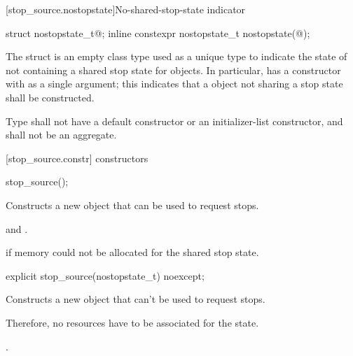 {%
[stop_source.nostopstate]{No-shared-stop-state indicator}

%
%
\begin{itemdecl}
struct nostopstate_t{@\seebelow@};
inline constexpr nostopstate_t nostopstate(@\unspec@);
\end{itemdecl}

\pnum
The struct  is an empty class type used as a unique type to indicate the state of
not containing a shared stop state for  objects.
In particular,  has a constructor with  as a single argument;
this indicates that a  object not sharing a stop state shall be constructed.

\pnum
Type  shall not have a default constructor or an initializer-list constructor, and shall not be an aggregate.

[stop_source.constr]{ constructors}

%
\begin{itemdecl}
stop_source();
\end{itemdecl}
\begin{itemdescr}
  \pnum\effects Constructs a new  object that can be used to request stops.
  
  \pnum\postconditions {} and .

  \pnum\throws {} if memory could not be allocated for the shared stop state.
\end{itemdescr}

%
\begin{itemdecl}
explicit stop_source(nostopstate_t) noexcept;
\end{itemdecl}
\begin{itemdescr}
  \pnum\effects Constructs a new  object that can't be used to request stops.
                \begin{note} Therefore, no resources have to be associated for the state.  \end{note}

  \pnum\postconditions {}.
\end{itemdescr}

}
